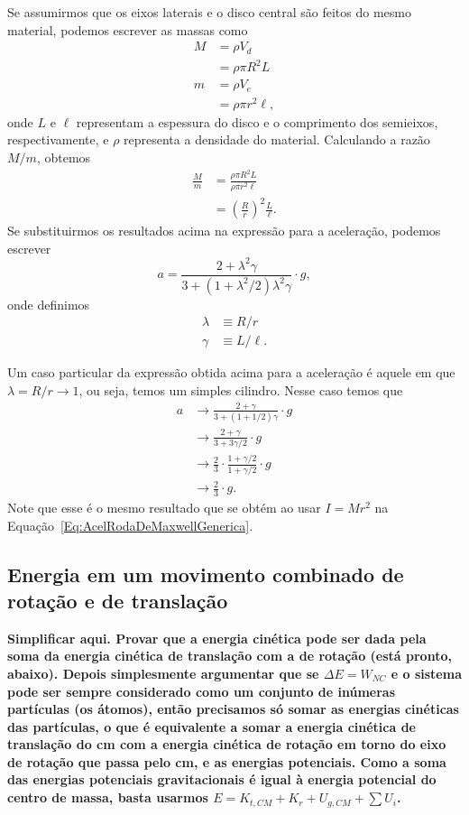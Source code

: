 Se assumirmos que os eixos laterais e o disco central são feitos do mesmo material, podemos escrever as massas como
\begin{align}
    M &= \rho V_d \\
    &= \rho \pi R^2 L \\
    m &= \rho V_e \\
    &= \rho \pi r^2 \ell,
\end{align}
%
onde $L$ e $\ell$ representam a espessura do disco e o comprimento dos semieixos, respectivamente, e $\rho$ representa a densidade do material. Calculando a razão $M/m$, obtemos
\begin{align}
    \frac{M}{m} &= \frac{\rho \pi R^2 L}{\rho \pi r^2 \ell} \\
    &= \left(\frac{R}{r}\right)^2\frac{L}{\ell}.
\end{align}
%
Se substituirmos os resultados acima na expressão para a aceleração, podemos escrever
\begin{equation}
    a = \frac{2 + \lambda^2\gamma}{3 + (1 + \lambda^2/2) \lambda^2 \gamma} \cdot g,
\end{equation}
%
onde definimos
\begin{align}
    \lambda &\equiv R/r \\
    \gamma &\equiv L/\ell.
\end{align}

Um caso particular da expressão obtida acima para a aceleração é aquele em que $\lambda = R/r \to 1$, ou seja, temos um simples cilindro. Nesse caso temos que
\begin{align}
    a &\to \frac{2 + \gamma}{3 + (1 + 1/2)\gamma} \cdot g \\
    &\to \frac{2 + \gamma}{3 + 3\gamma/2} \cdot g \\
    &\to \frac{2}{3} \cdot \frac{ 1 + \gamma/2}{1 + \gamma/2} \cdot g \\
    &\to \frac{2}{3} \cdot g.
\end{align}
%
Note que esse é o mesmo resultado que se obtém ao usar $I = Mr^2$ na Equação~\eqref{Eq:AcelRodaDeMaxwellGenerica}.

\subsection{Energia em um movimento combinado de rotação e de translação}

\textbf{Simplificar aqui. Provar que a energia cinética pode ser dada pela soma da energia cinética de translação com a de rotação (está pronto, abaixo). Depois simplesmente argumentar que se $\Delta E = W_{NC}$ e o sistema pode ser sempre considerado como um conjunto de inúmeras partículas (os átomos), então precisamos só somar as energias cinéticas das partículas, o que é equivalente a somar a energia cinética de translação do cm com a energia cinética de rotação em torno do eixo de rotação que passa pelo cm, e as energias potenciais. Como a soma das energias potenciais gravitacionais é igual à energia potencial do centro de massa, basta usarmos $E = K_{t, CM} + K_{r} + U_{g,CM} + \sum U_i$.}

